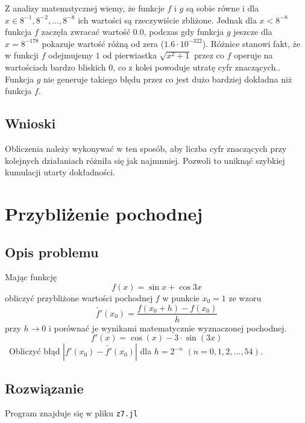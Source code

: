 \documentclass[a4paper]{article}
\begin{document}
     Z analizy matematycznej wiemy, że funkcje $f$ i $g$ są sobie równe i dla \(x \in {8^{-1}, 8^{-2},\dots,8^{-8}}\) ich wartości są rzeczywiście zbliżone. Jednak dla $x < 8^{-8}$ funkcja $f$ zaczęła zwracać wartość $0.0$, podczas gdy funkcja $g$ jeszcze dla $x = 8^{-178}$ pokazuje wartość różną od zera ($1.6\cdot 10^{-322}$). Różnice stanowi fakt, że w funkcji $f$ odejmujemy $1$ od pierwiastka \(\sqrt{x^2 + 1}\) przez co $f$ operuje na wartościach bardzo bliskich $0$, co z kolei powoduje utratę cyfr znaczących.. Funkcja $g$ nie generuje takiego błędu przez co jest dużo bardziej dokładna niż funkcja $f$.
    \subsection{Wnioski}
    Obliczenia należy wykonywać w ten sposób, aby liczba cyfr znaczących przy kolejnych działaniach różniła się jak najmnniej. Pozwoli to uniknąć szybkiej kumulacji utarty dokładności.

\section{Przybliżenie pochodnej}
    \subsection{Opis problemu}
    Mając funkcję \[f(x)=\sin{x}+\cos{3x}\] obliczyć przybliżone wartości pochodnej $f$ w punkcie $x_0 = 1$ ze wzoru \[\tilde{f'}(x_0)=\frac{f(x_0 + h)-f(x_0)}{h}\] przy \(h \to 0\) i porównać je wynikami matematycznie wyznaczonej pochodnej. \[f'(x)=\cos({x})-3\cdot \sin({3x})\] \ 
    Obliczyć  błąd  $|f'(x_0)-\tilde{f'}(x_0)|$ dla $h=2^{-n}$ $(n=0,1,2,\dots,54)$.
    
    \subsection{Rozwiązanie}
    Program znajduje się w pliku \texttt{z7.jl}
    
\end{document}
